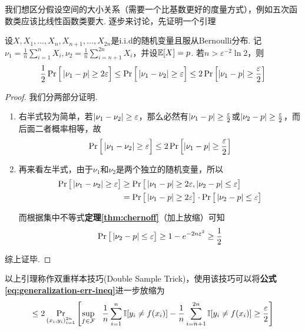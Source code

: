 我们想区分假设空间的大小关系（需要一个比基数更好的度量方式），例如五次函数类应该比线性函数类要大. 逐步来讨论，先证明一个引理 

\begin{lemma}
    设$X, X_1, \dots, X_n, X_{n+1}, \dots, X_{2n}$是i.i.d的随机变量且服从Bernoulli分布. 记$\nu_1 = \frac{1}{n} \sum\limits_{i=1}^{n} X_i, \nu_2 = \frac 1n \sum\limits_{i=n+1}^{2n} X_i$，并设$\mathbb{E}[X]=p$. 若$n > \varepsilon^{-2} \ln 2$，则
    \[
    \frac 12 \Pr\Big[
        \left\vert\nu_1-p\right\vert \ge 2\varepsilon
    \Big] \leq 
    \Pr\Big[
        \left\vert\nu_1 - \nu_2\right\vert \ge \varepsilon
    \Big] \leq 
    2 \Pr\left[
         \left\vert\nu_1-p\right\vert \ge \frac{\varepsilon}2
    \right]
    \]
\end{lemma}
\begin{proof}
    我们分两部分证明.

    \begin{enumerate}
        \item[\Circled{1}]右半式较为简单，若$\left\vert\nu_1 - \nu_2\right\vert \ge\varepsilon$，那么必然有$\left\vert\nu_1-p\right\vert \ge \frac\varepsilon 2$或$\left\vert\nu_2-p\right\vert \ge \frac\varepsilon 2$，而后面二者概率相等，故
    \[
    \Pr\Big[
        \left\vert\nu_1 - \nu_2\right\vert \ge \varepsilon
    \Big] \leq 
    2 \Pr\left[
         \left\vert\nu_1-p\right\vert \ge \frac{\varepsilon}2
    \right]
    \]
        \item[\Circled{2}] 再来看左半式，由于$\nu_1$和$\nu_2$是两个独立的随机变量，所以 
        \begin{align*}
            \Pr \big[
                \left\vert\nu_1 - \nu_2\right\vert \ge \varepsilon    
            \big] & \ge \Pr\big[
                \left\vert\nu_1 - p\right\vert \ge 2\varepsilon, \left\vert\nu_2 - p\right\vert \le \varepsilon
            \big] \\
            & = \Pr\big[
                \left\vert\nu_1 - p\right\vert \ge 2\varepsilon
            \big] \cdot \Pr\big[
                \left\vert\nu_2 - p\right\vert \le \varepsilon
            \big]
        \end{align*}

        而根据集中不等式\textbf{定理\ref{thm:chernoff}}（加上放缩）可知 
        \[
        \Pr\big[
                \left\vert\nu_2 - p\right\vert \le \varepsilon
        \big] \ge 1 - e^{
            -2n\varepsilon^2
        } \ge \dfrac 12
        \]
    \end{enumerate}
    综上证毕.
\end{proof}

以上引理称作双重样本技巧(Double Sample Trick)，使用该技巧可以将\textbf{公式\ref{eq:generalization-err-ineq}}进一步放缩为 
\[
\le 2 \Pr_{{(x_i, y_i)}_{i=1}^{2n}} \left[
    \sup_{f\in \mathcal{F}} \ \ \dfrac{1}{n} \sum_{i=1}^n \mathbb{I}[y_i \neq f(x_i)] - \dfrac{1}{n} \sum_{i=n+1}^{2n} \mathbb{I}[y_i \neq f(x_i)] \ge \dfrac{\varepsilon}2
\right]
\]

